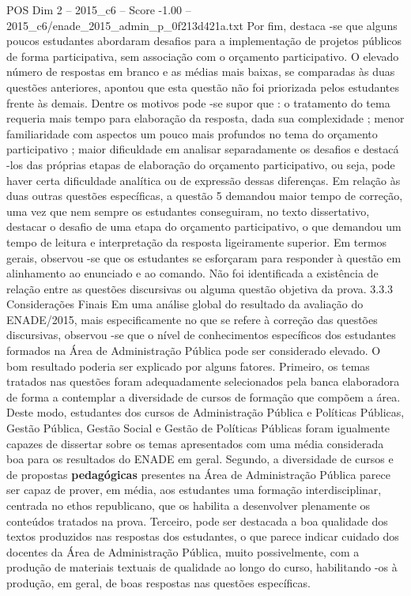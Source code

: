 \begin{textsample}{POS Dim 2 – 2015\_c6 – Score -1.00 – 2015\_c6/enade\_2015\_admin\_p\_0f213d421a.txt}
Por fim, destaca -se que alguns poucos estudantes abordaram desafios para a implementação de projetos públicos de forma participativa, sem associação com o orçamento participativo.
O elevado número de respostas em branco e as médias mais baixas, se comparadas às duas questões anteriores, apontou que esta questão não foi priorizada pelos estudantes frente às demais.
Dentre os motivos pode -se supor que : o tratamento do tema requeria mais tempo para elaboração da resposta, dada sua complexidade ; menor familiaridade com aspectos um pouco mais profundos no tema do orçamento participativo ; maior dificuldade em analisar separadamente os desafios e destacá -los das próprias etapas de elaboração do orçamento participativo, ou seja, pode haver certa dificuldade analítica ou de expressão dessas diferenças.
Em relação às duas outras questões específicas, a questão 5 demandou maior tempo de correção, uma vez que nem sempre os estudantes conseguiram, no texto dissertativo, destacar o desafio de uma etapa do orçamento participativo, o que demandou um tempo de leitura e interpretação da resposta ligeiramente superior.
Em termos gerais, observou -se que os estudantes se esforçaram para responder à questão em alinhamento ao enunciado e ao comando.
Não foi identificada a existência de relação entre as questões discursivas ou alguma questão objetiva da prova. 3.3.3 Considerações Finais Em uma análise global do resultado da avaliação do ENADE/2015, mais especificamente no que se refere à correção das questões discursivas, observou -se que o nível de conhecimentos específicos dos estudantes formados na Área de Administração Pública pode ser considerado elevado.
O bom resultado poderia ser explicado por alguns fatores.
Primeiro, os temas tratados nas questões foram adequadamente selecionados pela banca elaboradora de forma a contemplar a diversidade de cursos de formação que compõem a área.
Deste modo, estudantes dos cursos de Administração Pública e Políticas Públicas, Gestão Pública, Gestão Social e Gestão de Políticas Públicas foram igualmente capazes de dissertar sobre os temas apresentados com uma média considerada boa para os resultados do ENADE em geral.
Segundo, a diversidade de cursos e de propostas \textbf{pedagógicas} presentes na Área de Administração Pública parece ser capaz de prover, em média, aos estudantes uma formação interdisciplinar, centrada no ethos republicano, que os habilita a desenvolver plenamente os conteúdos tratados na prova.
Terceiro, pode ser destacada a boa qualidade dos textos produzidos nas respostas dos estudantes, o que parece indicar cuidado dos docentes da Área de Administração Pública, muito possivelmente, com a produção de materiais textuais de qualidade ao longo do curso, habilitando -os à produção, em geral, de boas respostas nas questões específicas.

\end{textsample}
